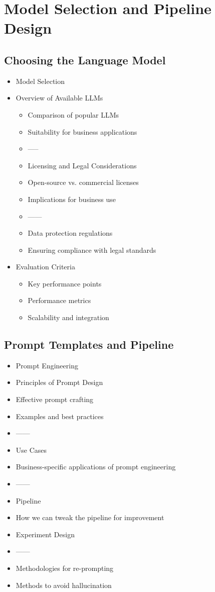 \chapter{Model Selection and Pipeline Design}
\section{Choosing the Language Model}
\begin{itemize}
    \item Model Selection
    \item Overview of Available LLMs
    \begin{itemize}
        \item Comparison of popular LLMs
        \item Suitability for business applications
        \item -----
        \item Licensing and Legal Considerations
        \item Open-source vs. commercial licenses
        \item Implications for business use
        \item ------
        \item Data protection regulations
        \item Ensuring compliance with legal standards
    \end{itemize}
    \item Evaluation Criteria
    \begin{itemize}
        \item Key performance points
        \item Performance metrics
        \item Scalability and integration
    \end{itemize}
\end{itemize}

\section{Prompt Templates and Pipeline}
\begin{itemize}
    \item Prompt Engineering
    \item Principles of Prompt Design
    \item Effective prompt crafting
    \item Examples and best practices
    \item ------
    \item Use Cases
    \item Business-specific applications of prompt engineering
    \item ------
    \item Pipeline
    \item How we can tweak the pipeline for improvement
    \item Experiment Design
    \item ------
    \item Methodologies for re-prompting
    \item Methods to avoid hallucination
\end{itemize}